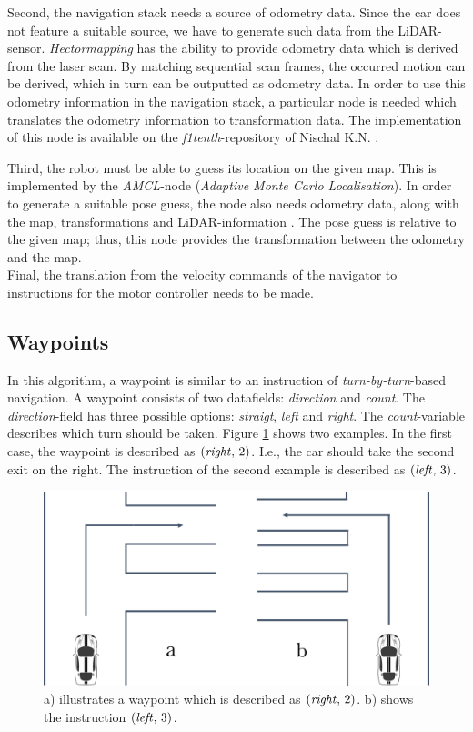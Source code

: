 \documentclass[conference,a4paper]{IEEEtran}
\begin{document}
Second, the navigation stack needs a source of odometry data. Since the car does not feature a suitable source, we have to generate such data from the LiDAR-sensor. \emph{Hector\textunderscore mapping} has the ability to provide odometry data which is derived from the laser scan. By matching sequential scan frames, the occurred motion can be derived, which in turn can be outputted as odometry data. In order to use this odometry information in the navigation stack, a particular node is needed which translates the odometry information to transformation data. The implementation of this node is available on the \emph{f1tenth}-repository of Nischal K.N. \cite{K.N.2016}.

Third, the robot must be able to guess its location on the given map. This is implemented by the \emph{AMCL}-node (\emph{Adaptive Monte Carlo Localisation}). In order to generate a suitable pose guess, the node also needs odometry data, along with the map, transformations and LiDAR-information \cite{Gerkey2016} \cite{Thrun1999}. The pose guess is relative to the given map; thus, this node provides the transformation between the odometry and the map.\\
Final, the translation from the velocity commands of the navigator to instructions for the motor controller needs to be made.

\subsection{Waypoints}
In this algorithm, a waypoint is similar to an instruction of  \emph{turn-by-turn}-based navigation. A waypoint consists of two datafields: \emph{direction} and \emph{count}.
The \emph{direction}-field has three possible options: \emph{straigt}, \emph{left} and \emph{right}. The \emph{count}-variable describes which turn should be taken. Figure \ref{fig:waypoints_turns} shows two examples. In the first case, the waypoint is described as $(\text{\emph{right}},\,2)$. I.e., the car should take the second exit on the right. The instruction of the second example is described as $(\text{\emph{left}},\,3)$. 

\begin{figure}[!t]
	\includegraphics[width=\columnwidth]{waypoints_turns}
	\centering
	\caption{a) illustrates a waypoint which is described as $(\text{\emph{right}},\,2)$. b) shows the instruction $(\text{\emph{left}},\,3)$. }
	\label{fig:waypoints_turns}
\end{figure}
\end{document}
